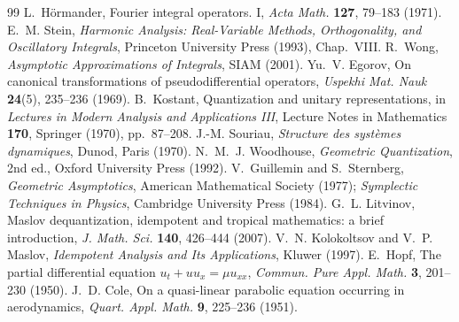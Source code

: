 \documentclass[11pt,a4paper]{article}
\theoremstyle{plain}
\theoremstyle{definition}
\theoremstyle{remark}
\begin{document}
\begin{thebibliography}{99}
 L.~H\"ormander, Fourier integral operators. I, \emph{Acta Math.} \textbf{127}, 79--183 (1971).
 E.~M. Stein, \emph{Harmonic Analysis: Real-Variable Methods, Orthogonality, and Oscillatory Integrals}, Princeton University Press (1993), Chap.~VIII.
 R.~Wong, \emph{Asymptotic Approximations of Integrals}, SIAM (2001).
 Yu.~V. Egorov, On canonical transformations of pseudodifferential operators, \emph{Uspekhi Mat. Nauk} \textbf{24}(5), 235--236 (1969).
 B.~Kostant, Quantization and unitary representations, in \emph{Lectures in Modern Analysis and Applications III}, Lecture Notes in Mathematics \textbf{170}, Springer (1970), pp.~87--208.
 J.-M. Souriau, \emph{Structure des syst\`emes dynamiques}, Dunod, Paris (1970).
 N.~M.~J. Woodhouse, \emph{Geometric Quantization}, 2nd ed., Oxford University Press (1992).
 V.~Guillemin and S.~Sternberg, \emph{Geometric Asymptotics}, American Mathematical Society (1977); \emph{Symplectic Techniques in Physics}, Cambridge University Press (1984).
 G.~L. Litvinov, Maslov dequantization, idempotent and tropical mathematics: a brief introduction, \emph{J. Math. Sci.} \textbf{140}, 426--444 (2007).
 V.~N. Kolokoltsov and V.~P. Maslov, \emph{Idempotent Analysis and Its Applications}, Kluwer (1997).
 E.~Hopf, The partial differential equation $u_t+uu_x=\mu u_{xx}$, \emph{Commun. Pure Appl. Math.} \textbf{3}, 201--230 (1950).
 J.~D. Cole, On a quasi-linear parabolic equation occurring in aerodynamics, \emph{Quart. Appl. Math.} \textbf{9}, 225--236 (1951).
\end{thebibliography}
\end{document}
